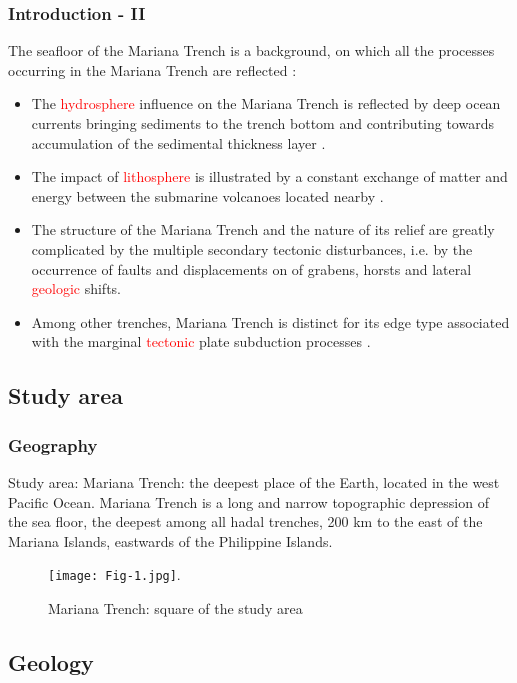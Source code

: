\documentclass[pdflatex,compress,8pt,
	xcolor={dvipsnames,dvipsnames,svgnames,x11names,table},
	hyperref={colorlinks = true,breaklinks = true, urlcolor = NavyBlue, breaklinks = true}]{beamer}
\begin{document}
\begin{frame}\frametitle{Introduction - II}
The seafloor of the Mariana Trench is a \textcolor{NavyBlue}{background}, on which all the processes occurring in the Mariana Trench are reflected \cite{Dic1974}:
 \begin{itemize}
	\item The \textcolor{red}{hydrosphere} influence on the Mariana Trench is reflected by deep ocean currents bringing sediments to the trench bottom and contributing towards accumulation of the sedimental thickness layer \cite{HorlestonHelffrich2012}.
	\item The impact of \textcolor{red}{lithosphere} is illustrated by a constant exchange of matter and energy between the submarine volcanoes located nearby \cite{HussongUyeda1982}.
	\item The structure of the Mariana Trench and the nature of its relief are greatly complicated by the multiple secondary tectonic disturbances, i.e. by the occurrence of faults and displacements on of grabens, horsts and lateral \textcolor{red}{geologic} shifts. 		
	\item Among other trenches, Mariana Trench is distinct for its edge type associated with the marginal \textcolor{red}{tectonic} plate subduction processes \cite{Boutelieretal2014}. 
 \end{itemize} 
 
\end{frame}

\subsection{Study area}

\begin{frame}\frametitle{Geography}
Study area: Mariana Trench: the deepest place of the Earth, located in the west Pacific Ocean. Mariana Trench is a long and narrow topographic depression of the sea floor, the deepest among all hadal trenches, 200 km to the east of the Mariana Islands, eastwards of the Philippine Islands.
\begin{figure}[H]
	\centering
		\texttt{[image: Fig-1.jpg]}.
		\caption{Mariana Trench: square of the study area}
\end{figure}
\end{frame}

\subsection{Geology}
\end{document}
